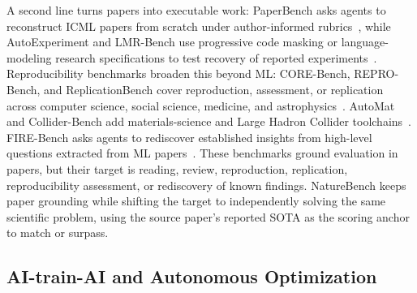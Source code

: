 \documentclass{llmxive}
\begin{document}
A second line turns papers into executable work: PaperBench asks agents to reconstruct ICML papers from scratch under author-informed rubrics~\citep{starace2025paperbench}, while AutoExperiment and LMR-Bench use progressive code masking or language-modeling research specifications to test recovery of reported experiments~\citep{kim2025autoexperiment,yan2025lmrbench}. Reproducibility benchmarks broaden this beyond ML: CORE-Bench, REPRO-Bench, and ReplicationBench cover reproduction, assessment, or replication across computer science, social science, medicine, and astrophysics~\citep{siegel2024corebench,hu2025reprobench,ye2025replicationbench}. AutoMat and Collider-Bench add materials-science and Large Hadron Collider toolchains~\citep{huang2026automat,faroughy2026colliderbench}. FIRE-Bench asks agents to rediscover established insights from high-level questions extracted from ML papers~\citep{wang2026firebench}. These benchmarks ground evaluation in papers, but their target is reading, review, reproduction, replication, reproducibility assessment, or rediscovery of known findings. NatureBench keeps paper grounding while shifting the target to independently solving the same scientific problem, using the source paper's reported SOTA as the scoring anchor to match or surpass.





\subsection{AI-train-AI and Autonomous Optimization}
\label{sec:rel:mle}
\end{document}
